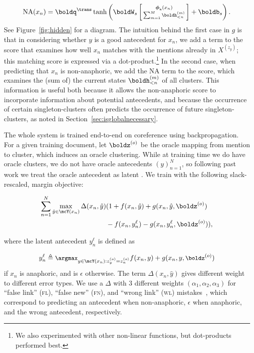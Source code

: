 \documentclass[11pt,letterpaper]{article}
\newcommand{\aphi}{\boldsymbol{\phi}_{\mathrm{a}}}
\begin{document}
{\small\begin{align*}
  \label{eq:1}
\mathrm{NA}(x_n) =  \boldq^\trans \tanh \left( \boldW_s \left[ \begin{smallmatrix} \aphi(x_n) \\ \sum_{m=1}^{M} \boldh^{(m)}_{<n}\end{smallmatrix}\right] + \boldb_s \right).
\end{align*}}See Figure~\ref{fig:hidden} for a diagram. The intuition behind the first case in $g$ is that in considering whether $y$ is a good antecedent for $x_n$, we add a term to the score that examines how well $x_n$ matches with the mentions already in $X^{(z_{y})}$; this matching score is expressed via a dot-product.\footnote{We also experimented with other non-linear functions, but dot-products performed best.} In the second case, when predicting that $x_n$ is non-anaphoric, we add the NA term to the score, which examines the (sum of) the current states $\boldh^{(m)}_{<n}$ of all clusters. This information is useful both because it allows the non-anaphoric score to incorporate information about potential antecedents, and because the occurrence of certain singleton-clusters often predicts the occurrence of future singleton-clusters, as noted in Section~\ref{sec:isglobalnecessary}.

The whole system is trained end-to-end on coreference using
backpropagation. For a given training document, let $\boldz^{(o)}$
be the oracle mapping from mention to cluster, which induces an oracle
clustering.
While at training time we do have oracle clusters, we do not have oracle antecedents $(y)_{n=1}^N$, so 
following past work we treat the oracle antecedent as latent \cite{yu2009learning,fernandes2012latent,Chang:13,DandK:13}.
We train with the following slack-rescaled, margin objective:

\vspace{-5mm}
{\small\begin{align*}
\sum_{n=1}^N  \max_{\hat{y} \in \mcY(x_n)} \Delta(x_n,\hat{y}) &(1  + f(x_n,\hat{y}) + g(x_n, \hat{y}, \boldz^{(o)}) \\ 
  &- f(x_n,y_n^{\ell}) -  g(x_n, y_n^{\ell}, \boldz^{(o)})),
\end{align*}}

\vspace{-5mm}
\noindent where the latent antecedent $y_n^{\ell}$ is defined as

\vspace{-5mm}
\begin{align*}
\small
y_n^{\ell} \triangleq \argmax_{y \in \mcY(x_n): z^{(o)}_y = z^{(o)}_n} f(x_n,y) +  g(x_n, y, \boldz^{(o)}) 
\end{align*}
if $x_n$ is anaphoric, and is $\epsilon$ otherwise. The term $\Delta(x_n,\hat{y})$ gives different
weight to different error types. We
use a $\Delta$ with 3 different weights
$(\alpha_1, \alpha_2, \alpha_3)$ for ``false link'' (\textsc{fl}), ``false new'' (\textsc{fn}), and ``wrong link'' (\textsc{wl}) mistakes~\cite{DandK:13}, which correspond to predicting an antecedent when non-anaphoric, $\epsilon$ when anaphoric, and the wrong antecedent, respectively.
\end{document}

